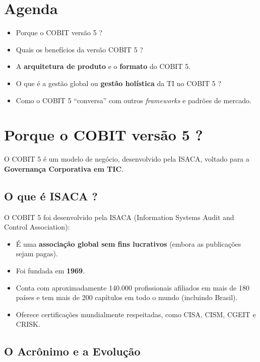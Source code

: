 \documentclass[
]{book}
\providecommand{\tightlist}{%
  \setlength{\itemsep}{0pt}\setlength{\parskip}{0pt}}
\begin{document}
\section{Agenda}\label{agenda}

\begin{itemize}
\tightlist
\item
  Porque o COBIT versão 5 ?
\item
  Quais os benefícios da versão COBIT 5 ?
\item
  A \textbf{arquitetura de produto} e o \textbf{formato} do COBIT 5.
\item
  O que é a gestão global ou \textbf{gestão holística} da TI no COBIT 5 ?
\item
  Como o COBIT 5 ``conversa'' com outros \emph{frameworks} e padrões de mercado.
\end{itemize}

\section{Porque o COBIT versão 5 ?}\label{porque-o-cobit-versuxe3o-5}

O COBIT 5 é um modelo de negócio, desenvolvido pela ISACA, voltado para a \textbf{Governança Corporativa em TIC}.

\subsection{O que é ISACA ?}\label{o-que-uxe9-isaca}

O COBIT 5 foi desenvolvido pela ISACA (Information Systems Audit and Control Association):

\begin{itemize}
\tightlist
\item
  É uma \textbf{associação global sem fins lucrativos} (embora as publicações sejam pagas).
\item
  Foi fundada em \textbf{1969}.
\item
  Conta com aproximadamente 140.000 profissionais afiliados em mais de 180 países e tem mais de 200 capítulos em todo o mundo (incluindo Brasil).
\item
  Oferece certificações mundialmente respeitadas, como CISA, CISM, CGEIT e CRISK.
\end{itemize}

\subsection{O Acrônimo e a Evolução}\label{o-acruxf4nimo-e-a-evoluuxe7uxe3o}
\end{document}

